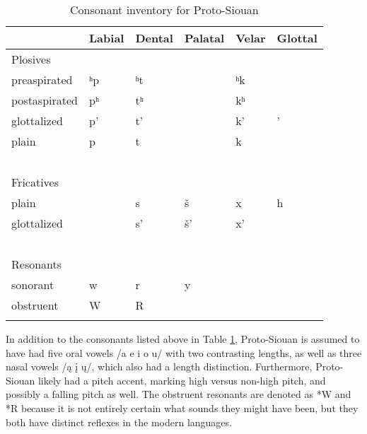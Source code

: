 \documentclass[output=paper]{LSP/langsci}
\begin{document}
\begin{table}[h!]
\caption{Consonant inventory for Proto-Siouan} \label{psiinventory}
    \begin{tabular}{llllll} \lsptoprule
    ~                   & Labial    & Dental     & Palatal & Velar    & Glottal \\
   \midrule
  Plosives   & ~                   & ~                   & ~                & ~                   & ~                \\
    preaspirated        & ʰp & ʰt & ~                & ʰk & ~                \\
    postaspirated       & pʰ & tʰ & ~                & kʰ & ~                \\
    glottalized         & p'                  & t'                  & ~                & k'                  & '                \\
    plain               & p                   & t                   & ~                & k                   & ~                \\
    ~                   & ~                   & ~                   & ~                & ~                   & ~                \\
  Fricatives & ~                   & ~                   & ~                & ~                   & ~                \\
    plain               & ~                   & s                   & \v{s}            & x                   & h                \\
    glottalized         & ~                   & s'                  & \v{s}'           & x'                  & ~                \\
    ~                   & ~                   & ~                   & ~                & ~                   & ~                \\
Resonants  & ~                   & ~                   & ~                & ~                   & ~                \\
    sonorant            & w                   & r                   & y                & ~                   & ~                \\
    obstruent           & W                   & R                   & ~                & ~                   & ~                \\ \lspbottomrule
    \end{tabular}
\end{table}

In addition to the consonants listed above in Table \ref{psiinventory}, Proto-Siouan is assumed to have had five oral vowels /a e i o u/ with two contrasting lengths, as well as three nasal vowels /\k{a} \k{i} \k{u}/, which also had a length distinction. Furthermore, Proto-Siouan likely had a pitch accent, marking high versus non-high pitch, and possibly a falling pitch as well. The obstruent resonants are denoted as *W and *R because it is not entirely certain what sounds they might have been, but they both have distinct reflexes in the modern languages.
\end{document}
